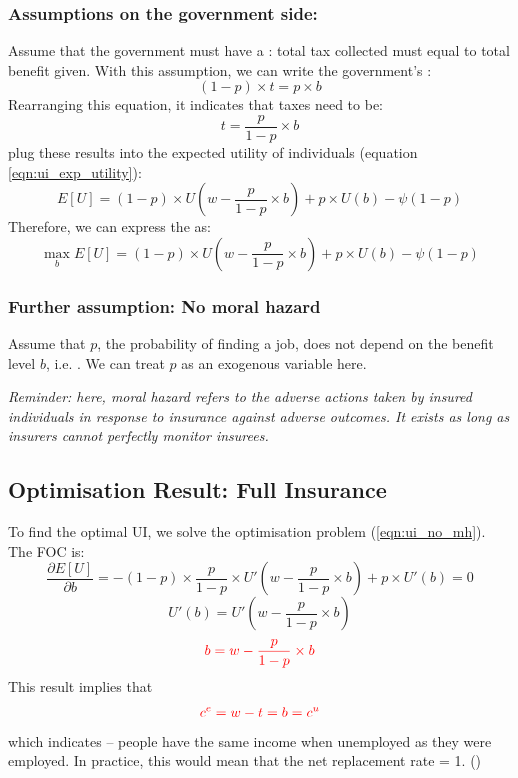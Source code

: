            \subsubsection{Assumptions on the government side:}
                Assume that the government must have a : total tax collected must equal to total benefit given. With this assumption, we can write the government's :
                $$(1-p)\times{t} = p\times{b}$$
                Rearranging this equation, it indicates that taxes need to be:
                $$t = \frac{p}{1-p}\times{b}$$
                plug these results into the expected utility of individuals (equation \ref{eqn:ui_exp_utility}):
                $$E[U] = (1-p)\times{U(w-\frac{p}{1-p}\times{b})} + p\times{U(b)} - \psi(1-p)$$
                Therefore, we can express the  as:
                \begin{equation}
                    \label{eqn:ui_no_mh}
                    \max_{b} E[U] = (1-p)\times{U(w-\frac{p}{1-p}\times{b})} + p\times{U(b)} - \psi(1-p)
                    \end{equation}
                    
            \subsubsection{Further assumption: No moral hazard}
                Assume that $p$, the probability of finding a job, does not depend on the benefit level $b$, i.e. . We can treat $p$ as an exogenous variable here.
                
                \emph{Reminder: here, moral hazard refers to the adverse actions taken by insured individuals in response to insurance against adverse outcomes. It exists as long as insurers cannot perfectly monitor insurees.}
                
        \subsection{Optimisation Result: Full Insurance}
            To find the optimal UI, we solve the optimisation problem (\ref{eqn:ui_no_mh}). The FOC is:
            $$\frac{\partial E[U]}{\partial b}=-(1-p)\times{\frac{p}{1-p}}\times{U'(w-\frac{p}{1-p}\times{b})} + p\times{U'(b)} = 0$$
            $$U'(b) = U'(w-\frac{p}{1-p}\times{b})$$
            $$\color{red} b = w-\frac{p}{1-p}\times{b}$$
            This result implies that
            \[\color{red} c^e = w-t = b = c^u\]
            which indicates  -- people have the same income when unemployed as they were employed. In practice, this would mean that the net replacement rate = 1. ()
            
